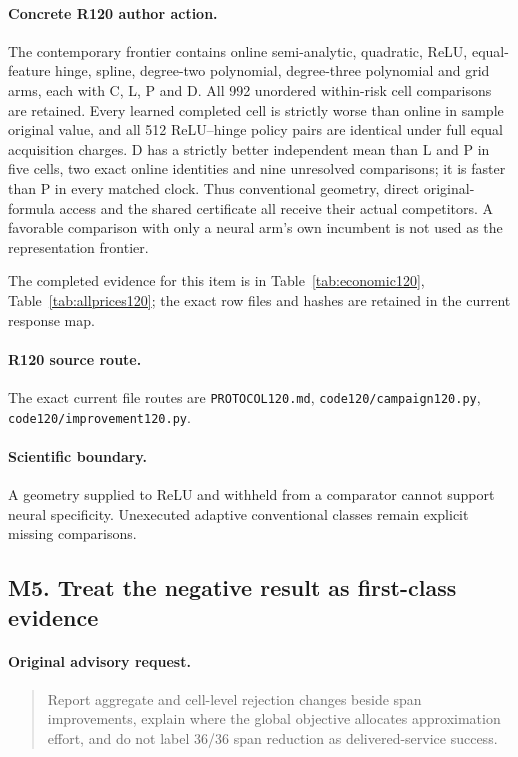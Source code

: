 \paragraph{Concrete R120 author action.}
The contemporary frontier contains online semi-analytic, quadratic, ReLU, equal-feature hinge, spline, degree-two polynomial, degree-three polynomial and grid arms, each with C, L, P and D. All 992 unordered within-risk cell comparisons are retained. Every learned completed cell is strictly worse than online in sample original value, and all 512 ReLU--hinge policy pairs are identical under full equal acquisition charges. D has a strictly better independent mean than L and P in five cells, two exact online identities and nine unresolved comparisons; it is faster than P in every matched clock. Thus conventional geometry, direct original-formula access and the shared certificate all receive their actual competitors. A favorable comparison with only a neural arm's own incumbent is not used as the representation frontier.

The completed evidence for this item is in Table~\ref{tab:economic120}, Table~\ref{tab:allprices120}; the exact row files and hashes are retained in the current response map.
\paragraph{R120 source route.}
The exact current file routes are \nolinkurl{PROTOCOL120.md}, \nolinkurl{code120/campaign120.py}, \nolinkurl{code120/improvement120.py}.
\paragraph{Scientific boundary.}
A geometry supplied to ReLU and withheld from a comparator cannot support neural specificity. Unexecuted adaptive conventional classes remain explicit missing comparisons.

\subsection{M5. Treat the negative result as first-class evidence}
\label{response120:M5}
\paragraph{Original advisory request.}
\begin{quote}
Report aggregate and cell-level rejection changes beside span improvements, explain where the global objective allocates approximation effort, and do not label 36/36 span reduction as delivered-service success.
\end{quote}
